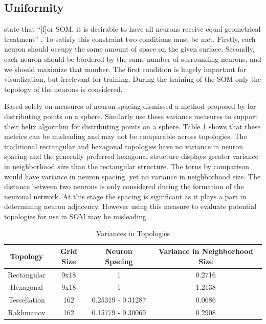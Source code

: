 \documentclass[11pt]{article}
\begin{document}
\subsection{Uniformity}
\citeauthor{wu2006} state that ``[f]or SOM, it is desirable to have all neurons receive equal geometrical treatment'' \cite[pp. 900]{wu2006}.  To satisfy this constraint two conditions must be met.  Firstly, each neuron should occupy the same amount of space on the given surface.  Secondly, each neuron should be bordered by the same number of surrounding neurons, and we should maximize that number.  The first condition is hugely important for visualization, but irrelevant for training.  During the training of the SOM only the topology of the neurons is considered.

Based solely on measures of neuron spacing \cite{wu2005} dismissed a method proposed by \cite{Rakhmanov94} for distributing points on a sphere.  Similarly \cite{Nishio:2006fk} use these variance measures to support their helix algorithm for distributing points on a sphere.  Table \ref{table1} shows that these metrics can be misleading and may not be comparable across topologies.  The traditional rectangular and hexagonal topologies have no variance in neuron spacing and the generally preferred hexagonal structure displays greater variance in neighborhood size than the rectangular structure.  The torus by comparison would have variance in neuron spacing, yet no variance in neighborhood size.  The distance between two neurons is only considered during the formation of the neuronal network.  At this stage the spacing is significant as it plays a part in determining neuron adjacency. However using this measure to evaluate potential topologies for use in SOM may be misleading.

\begin{table}[htbp]
\caption{Variances in Topologies}
\begin{center}
\begin{tabular}{|c|c|c|c|}
\hline
Topology&Grid Size&Neuron Spacing&Variance in Neighborhood Size\\
\hline
Rectangular&9x18&1&0.2716\\
Hexagonal&9x18&1&1.2138\\
Tessellation&162&0.25319 - 0.31287& 0.0686\\
Rakhmanov&162&0.15779 - 0.30069& 0.2908\\
\hline
\end{tabular}
\end{center}
\label{table1}
\end{table}
\end{document}
